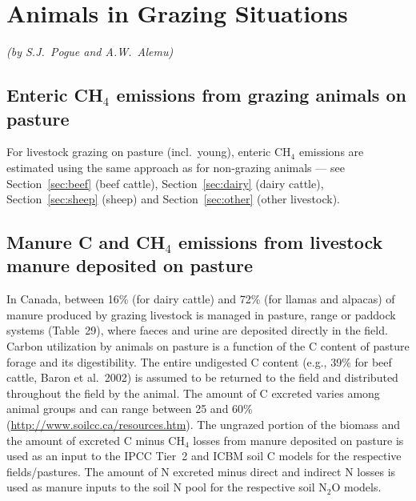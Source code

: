 \chapter{Animals in Grazing Situations}
\label{ch:grazing}

\noindent\textit{(by S.J.\ Pogue and A.W.\ Alemu)}

\section{Enteric CH\texorpdfstring{$_4$}{4} emissions from grazing animals on pasture}
\label{sec:grazing-enteric}

For livestock grazing on pasture (incl.\ young), enteric CH$_4$ emissions are
estimated using the same approach as for non-grazing animals --- see
Section~\ref{sec:beef} (beef cattle), Section~\ref{sec:dairy} (dairy cattle),
Section~\ref{sec:sheep} (sheep) and Section~\ref{sec:other} (other livestock).

\section{Manure C and CH\texorpdfstring{$_4$}{4} emissions from livestock manure deposited on pasture}
\label{sec:grazing-manure-ch4}

In Canada, between 16\% (for dairy cattle) and 72\% (for llamas and alpacas) of
manure produced by grazing livestock is managed in pasture, range or paddock
systems (Table~29), where faeces and urine are deposited directly in the field.
Carbon utilization by animals on pasture is a function of the C content of
pasture forage and its digestibility. The entire undigested C content (e.g.,
39\% for beef cattle, Baron et al.\ 2002) is assumed to be returned to the field
and distributed throughout the field by the animal. The amount of C excreted
varies among animal groups and can range between 25 and 60\%
(\url{http://www.soilcc.ca/resources.htm}). The ungrazed portion of the biomass
and the amount of excreted C minus CH$_4$ losses from manure deposited on
pasture is used as an input to the IPCC Tier~2 and ICBM soil C models for the
respective fields/pastures. The amount of N excreted minus direct and indirect N
losses is used as manure inputs to the soil N pool for the respective soil
N$_2$O models.

